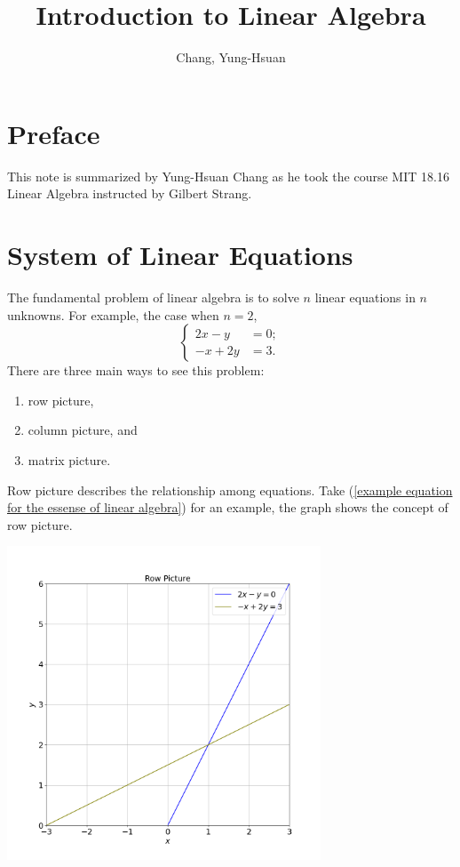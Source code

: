 \documentclass[11pt]{article}
\title{\textbf{Introduction to Linear Algebra}}
\author{Chang, Yung-Hsuan}
\theoremstyle{break}
\theoremstyle{no_label}
\numberwithin{equation}{theorem}
\begin{document}
\maketitle
\thispagestyle{empty}
\newpage
{}
\newpage
{}
{}
\tableofcontents
\newpage

{}
\section*{Preface}

This note is summarized by Yung-Hsuan Chang as he took the course MIT 18.16 Linear Algebra instructed by Gilbert Strang.

\newpage
{}

\section{System of Linear Equations}

The fundamental problem of linear algebra is to solve $n$ linear equations in $n$ unknowns. For example, the case when $n=2$,
\begin{equation}\label{example equation for the essense of linear algebra}
    \left\{\begin{array}{rl}
        2x-y\!\!\!&=0;\\
        -x+2y\!\!\!&=3.
    \end{array}\right.
\end{equation}
There are three main ways to see this problem:
\begin{enumerate}
    \item row picture,
    \item column picture, and
    \item matrix picture.
\end{enumerate}

Row picture describes the relationship among equations. Take (\ref{example equation for the essense of linear algebra}) for an example, the graph shows the concept of row picture.

\begin{center}
    \includegraphics[width=0.7\textwidth]{example equation for the essense of linear algebra.png}
\end{center}
\end{document}
